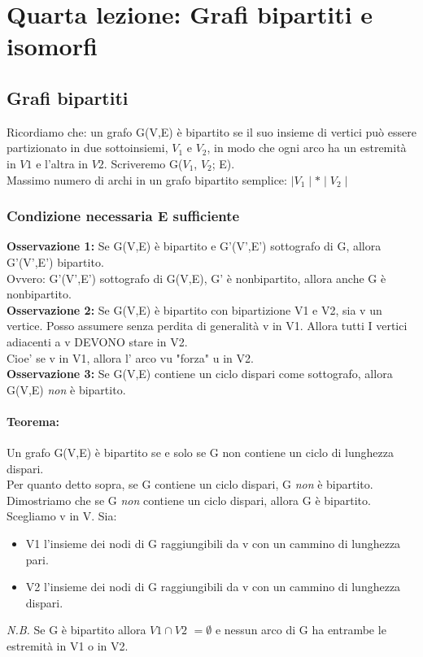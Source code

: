 \section{Quarta lezione: Grafi bipartiti e isomorfi}
\subsection{Grafi bipartiti}

Ricordiamo che: un grafo G(V,E) è bipartito se il suo insieme di vertici può essere partizionato in due
sottoinsiemi, $V_1$ e $V_2$, in modo che ogni arco ha un estremità in $V1$ e l'altra in $V2$. Scriveremo G($V_1$, $V_2$; E). \\
Massimo numero di archi in un grafo bipartito semplice: \( \mid V_1 \mid * \mid V_2 \mid \) 

\subsubsection{Condizione necessaria E sufficiente} 
\textbf{Osservazione 1:} Se G(V,E) è bipartito e G'(V',E') sottografo di G, allora G'(V',E') bipartito. \\
Ovvero:
G'(V',E') sottografo di G(V,E), G' è nonbipartito, allora anche G è nonbipartito. \\
\textbf{Osservazione 2:} Se G(V,E) è bipartito con bipartizione V1 e V2, sia v un vertice. Posso assumere senza perdita di generalità v in V1. Allora tutti I vertici adiacenti a v DEVONO stare in V2. \\
Cioe' se v in V1, allora l' arco vu "forza" u in V2.\\
\textbf{Osservazione 3:} Se G(V,E) contiene un ciclo dispari come sottografo, allora G(V,E) \emph{non} è bipartito.\\
\paragraph{Teorema:} 
Un grafo G(V,E) è bipartito se e solo se G non contiene un ciclo di lunghezza dispari. \\
Per quanto detto sopra, se G contiene un ciclo dispari, G \emph{non} è bipartito. \\
Dimostriamo che se G \emph{non} contiene un ciclo dispari, allora G è bipartito. Scegliamo v in V. Sia:
\begin{itemize}
\item V1 l'insieme dei nodi di G raggiungibili da v con un cammino di lunghezza pari.
\item V2 l'insieme dei nodi di G raggiungibili da v con un cammino di lunghezza dispari.
\end{itemize}
\emph{N.B.} Se G è bipartito allora \(V1 \cap V2 \)  $= \emptyset $ e nessun arco di G ha entrambe le estremità in V1 o in V2.


